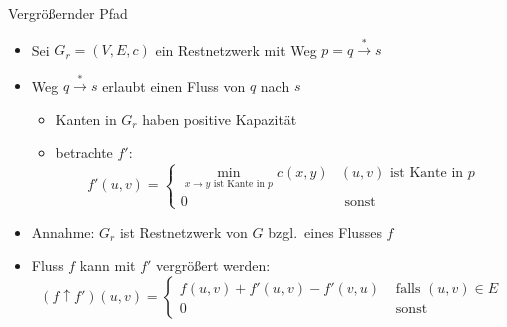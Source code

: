 \documentclass{vorlesung}
\newcommand{\weg}{\stackrel{*}{\to}}
\begin{document}
\begin{frame}{Vergrößernder Pfad}
\begin{itemize}
  \item Sei $G_r=(V,E,c)$ ein Restnetzwerk mit Weg $p = q\weg s$
  \item Weg $q\weg s$ erlaubt einen Fluss von $q$ nach $s$
  \begin{itemize}
  	\item Kanten in $G_r$ haben positive Kapazität
	\item betrachte $f'$:
	$$f'(u,v) = \left\{\begin{array}{ll} \min\limits_{x\to y\text{ ist Kante in } p} c(x,y) & (u,v)\text{ ist Kante in } p\\
	0 & \text{ sonst }\end{array}\right.
	$$
  \end{itemize}
  	\item Annahme: $G_r$ ist Restnetzwerk von $G$ bzgl.\ eines Flusses $f$
  \item Fluss $f$ kann mit $f'$ vergrößert werden:
  $$
  (f \uparrow f') (u,v) = \left\{\begin{array}{ll}
  f(u,v) + f'(u,v) - f'(v,u) & \text{ falls } (u,v) \in E\\
  0 & \text{ sonst }
  \end{array}\right.
  $$
\end{itemize}
\end{frame}
%
\end{document}
